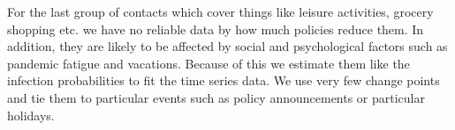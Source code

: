 
For the last group of contacts which cover things like leisure activities, grocery
shopping etc. we have no reliable data by how much policies reduce them.
In addition, they are likely to be affected by social and psychological factors such as
pandemic fatigue and vacations. Because of this we estimate them like the infection
probabilities to fit the time series data. We use very few change points and tie them to
particular events such as policy announcements or particular holidays.

\FloatBarrier
